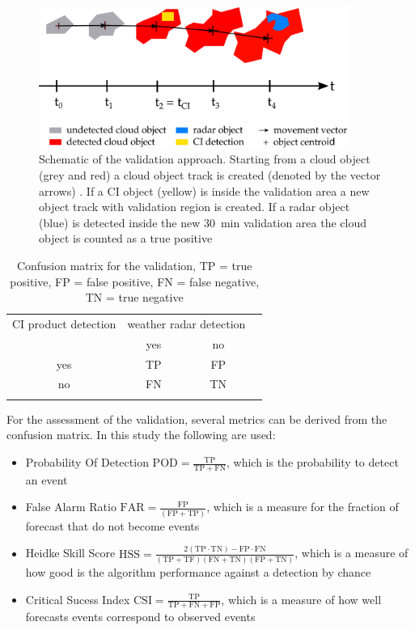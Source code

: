 \begin{figure}[htbp]
\centering
\includegraphics[width=0.9\textwidth]{Grafiken/Abbildungen/verification_scheme_new.pdf}
\caption{Schematic of the validation approach. Starting from a cloud object (grey and red) a cloud object track is created (denoted by the vector arrows) . If a CI object (yellow) is inside the validation area a new object track with validation region is created. If a radar object (blue) is detected inside the new \SI{30}{\minute} validation area the cloud object is counted as a true positive}
\label{fig:schema}
\end{figure}

\begin{table}[htbp]
\centering
\caption{Confusion matrix for the validation, TP = true positive, FP = false positive, FN = false negative, TN = true negative}
\begin{tabular}{cccc} 
\toprule
{CI product detection} & \multicolumn{2}{c}{weather radar detection} \\
					   \cmidrule{2-3}
					   & yes  & no \\
\midrule
yes                    &  TP  & FP \\
no                     &  FN  & TN \\ 
\addlinespace
\bottomrule
\end{tabular}
\label{tab:confusion}
\end{table}

For the assessment of the validation, several metrics can be derived from the confusion matrix. In this study the following are used:

\begin{itemize}
\item Probability Of Detection $\mathrm{POD} = \frac{\mathrm{TP}}{\mathrm{TP} + \mathrm{FN}}$, which is the probability to detect an event
\item False Alarm Ratio $ \mathrm{FAR} = \frac{\mathrm{FP}}{(\mathrm{FP} + \mathrm{TP})} $, which is a measure for the fraction of forecast that do not become events
\item Heidke Skill Score \citep{Heidke1926} $\mathrm{HSS} = \frac{2 (\mathrm{TP} \cdot \mathrm{TN}) - \mathrm{FP} \cdot \mathrm{FN}}{ (\mathrm{TP} + \mathrm{TF}) (\mathrm{FN} + \mathrm{TN}) (\mathrm{FP} + \mathrm{TN})}$, which is a measure of how good is the algorithm performance against a detection by chance
\item Critical Sucess Index $ \mathrm{CSI} = \frac{\mathrm{TP}}{\mathrm{TP} + \mathrm{FN} + \mathrm{FP}}$, which is a measure of how well forecasts events correspond to observed events 
\end{itemize}